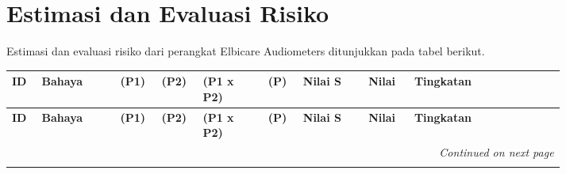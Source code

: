 \documentclass[11pt,a4paper,twoside,onecolumn]{book}
\begin{document}
		\section{Estimasi dan Evaluasi Risiko}
		Estimasi dan evaluasi risiko dari perangkat Elbicare Audiometers ditunjukkan pada tabel berikut.
		
		\begin{longtable}{p{0.04\linewidth} p{0.12\linewidth} p{0.05\linewidth} p{0.05\linewidth} p{0.10\linewidth} p{0.05\linewidth} p{0.10\linewidth} p{0.07\linewidth} p{0.23\linewidth}}
		
		\hline
		\cellcolor{yellow} \textbf{ID} & \cellcolor{yellow} \textbf{Bahaya} & \cellcolor{yellow} \textbf{(P1)} & \cellcolor{yellow} \textbf{(P2)} & \cellcolor{yellow} \textbf{(P1 x P2)} & \cellcolor{yellow} \textbf{(P)} & \cellcolor{yellow} \textbf{Nilai S} & \cellcolor{yellow} \textbf{Nilai} & \cellcolor{yellow} \textbf{Tingkatan }\\
		\hline
		\endfirsthead
		\hline
		\cellcolor{yellow} \textbf{ID} & \cellcolor{yellow} \textbf{Bahaya} & \cellcolor{yellow} \textbf{(P1)} & \cellcolor{yellow} \textbf{(P2)} & \cellcolor{yellow} \textbf{(P1 x P2)} & \cellcolor{yellow} \textbf{(P)} & \cellcolor{yellow} \textbf{Nilai S} & \cellcolor{yellow} \textbf{Nilai} & \cellcolor{yellow} \textbf{Tingkatan }\\
		\hline
		\endhead
		\hline
		\multicolumn{9}{r}{\textit{Continued on next page}} \\
		\endfoot
		\hline
		\endlastfoot
		

\end{longtable}
\end{document}
